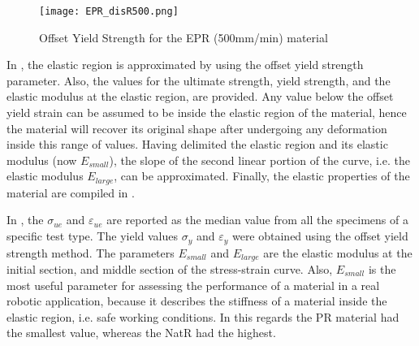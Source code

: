 \begin{figure}[H]
    \vspace*{-2em}
    \centering
    \texttt{[image: EPR\_disR500.png]}
    \caption{Offset Yield Strength for the EPR (500mm/min) material}
    \label{fig:EPR500off}
\end{figure}

In , the elastic region is approximated by using the offset yield strength parameter. Also, the values for the ultimate strength, yield strength, and the elastic modulus at the elastic region, are provided. Any value below the offset yield strain can be assumed to be inside the elastic region of the material, hence the material will recover its original shape after undergoing any deformation inside this range of values. Having delimited the elastic region and its elastic modulus (now $E_{small}$), the slope of the second linear portion of the curve, i.e. the elastic modulus $E_{large}$, can be approximated. Finally, the elastic properties of the material are compiled in .

In , the $\sigma_{ue}$ and $\varepsilon_{ue}$ are reported as the median value from all the specimens of a specific test type. The yield values $\sigma_{y}$ and $\varepsilon_{y}$ were obtained using the offset yield strength method. The parameters $E_{small}$ and $E_{large}$ are the elastic modulus at the initial section, and middle section of the stress-strain curve. Also, $E_{small}$ is the most useful parameter for assessing the performance of a material in a real robotic application, because it describes the stiffness of a material inside the elastic region, i.e. safe working conditions. In this regards the PR material had the smallest value, whereas the NatR had the highest.



